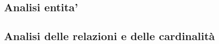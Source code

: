 \subsection{Analisi entita'}\label{analisi_entita}
    
    
\subsection{Analisi delle relazioni e delle cardinalità}
	